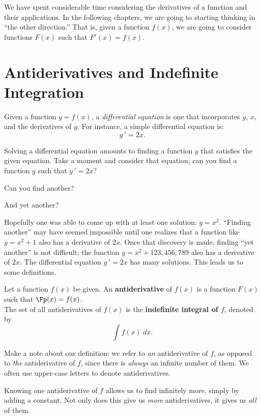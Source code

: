 We have spent considerable time considering the derivatives of a function and their applications. In the following chapters, we are going to starting thinking in ``the other direction.'' That is, given a function $f(x)$, we are going to consider functions $F(x)$ such that $F'(x) = f(x)$.



\section{Antiderivatives and Indefinite Integration}\label{sec:antider}

Given a function $y=f(x)$, a \textit{differential equation} is one that incorporates $y$, $x$, and the derivatives of $y$. For instance, a simple differential equation is: $$y\,' = 2x.$$

Solving a differential equation amounts to finding a function $y$ that satisfies the given equation. Take a moment and consider that equation; can you find a function $y$ such that $y\,' = 2x$?

Can you find another?

And yet another?

Hopefully one was able to come up with at least one solution: $y = x^2$. ``Finding another'' may have seemed impossible until one realizes that a function like $y=x^2+1$ also has a derivative of $2x$. Once that discovery is made, finding ``yet another'' is not difficult; the function $y = x^2 + 123,456,789$ also has a derivative of $2x$. The differential equation $y\,' = 2x$ has many solutions. This leads us to some definitions.

{Let a function $f(x)$ be given. An \textbf{antiderivative} of $f(x)$ is a function $F(x)$ such that $\Fp(x) = f(x)$.\\

The set of all antiderivatives of $f(x)$ is the \textbf{indefinite integral of $f$}, denoted by $$\int f(x) \ dx.$$
}

Make a note about our definition: we refer to \textit{an} antiderivative of $f$, as opposed to \textit{the} antiderivative of $f$, since there is \textit{always} an infinite number of them. We often use upper-case letters to denote antiderivatives.

Knowing one antiderivative of $f$ allows us to find infinitely more, simply by adding a constant. Not only does this give us \textit{more} antiderivatives, it gives us \textit{all} of them.

